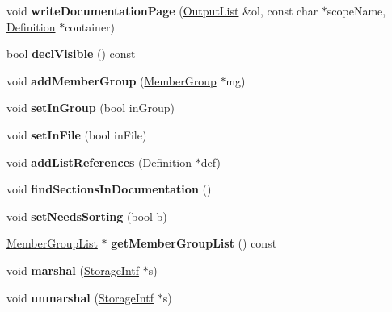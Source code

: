 \begin{DoxyCompactItemize}
\item 
\hypertarget{class_member_list_a94ed17cbea99b53687b20c95c414dfe9}{void {\bfseries write\-Documentation\-Page} (\hyperlink{class_output_list}{Output\-List} \&ol, const char $\ast$scope\-Name, \hyperlink{class_definition}{Definition} $\ast$container)}\label{class_member_list_a94ed17cbea99b53687b20c95c414dfe9}

\item 
\hypertarget{class_member_list_aedd04700c60d04c1dbcce71a94a22eac}{bool {\bfseries decl\-Visible} () const }\label{class_member_list_aedd04700c60d04c1dbcce71a94a22eac}

\item 
\hypertarget{class_member_list_a800de0531af7a794101cd82dcbc58359}{void {\bfseries add\-Member\-Group} (\hyperlink{class_member_group}{Member\-Group} $\ast$mg)}\label{class_member_list_a800de0531af7a794101cd82dcbc58359}

\item 
\hypertarget{class_member_list_afe13942dbccdc38f4eca7c5bffee20b4}{void {\bfseries set\-In\-Group} (bool in\-Group)}\label{class_member_list_afe13942dbccdc38f4eca7c5bffee20b4}

\item 
\hypertarget{class_member_list_af759ec4fc3c2e3ae8d97a1c9c134597c}{void {\bfseries set\-In\-File} (bool in\-File)}\label{class_member_list_af759ec4fc3c2e3ae8d97a1c9c134597c}

\item 
\hypertarget{class_member_list_a32f0a0cb5d2eb858724274323273a007}{void {\bfseries add\-List\-References} (\hyperlink{class_definition}{Definition} $\ast$def)}\label{class_member_list_a32f0a0cb5d2eb858724274323273a007}

\item 
\hypertarget{class_member_list_ad714b0e193e95efc23bb5de8dfb76cb6}{void {\bfseries find\-Sections\-In\-Documentation} ()}\label{class_member_list_ad714b0e193e95efc23bb5de8dfb76cb6}

\item 
\hypertarget{class_member_list_af75e6ecce24a4652211c1edb00c269a5}{void {\bfseries set\-Needs\-Sorting} (bool b)}\label{class_member_list_af75e6ecce24a4652211c1edb00c269a5}

\item 
\hypertarget{class_member_list_ae7ce2ca476057cec833444ddb27b7671}{\hyperlink{class_member_group_list}{Member\-Group\-List} $\ast$ {\bfseries get\-Member\-Group\-List} () const }\label{class_member_list_ae7ce2ca476057cec833444ddb27b7671}

\item 
\hypertarget{class_member_list_afe4468956cf875cb0e851e7a5453b657}{void {\bfseries marshal} (\hyperlink{class_storage_intf}{Storage\-Intf} $\ast$s)}\label{class_member_list_afe4468956cf875cb0e851e7a5453b657}

\item 
\hypertarget{class_member_list_aa32479629433537e552d4a66df9acf60}{void {\bfseries unmarshal} (\hyperlink{class_storage_intf}{Storage\-Intf} $\ast$s)}\label{class_member_list_aa32479629433537e552d4a66df9acf60}

\end{DoxyCompactItemize}
